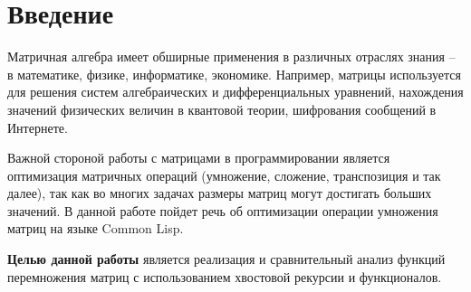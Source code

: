 \newpage
\chapter*{Введение}
Матричная алгебра имеет обширные применения в различных отраслях знания – в математике, физике, информатике, экономике. Например, матрицы используется для решения систем алгебраических и дифференциальных уравнений, нахождения значений физических величин в квантовой теории, шифрования сообщений в Интернете.

Важной стороной работы с матрицами в программировании является оптимизация матричных операций (умножение, сложение, транспозиция и так далее), так как во многих задачах размеры матриц могут достигать больших значений. 
В данной работе пойдет речь об оптимизации операции умножения матриц на языке Common Lisp.


\textbf{Целью данной работы} является реализация и сравнительный анализ функций перемножения матриц с использованием хвостовой рекурсии и функционалов.
